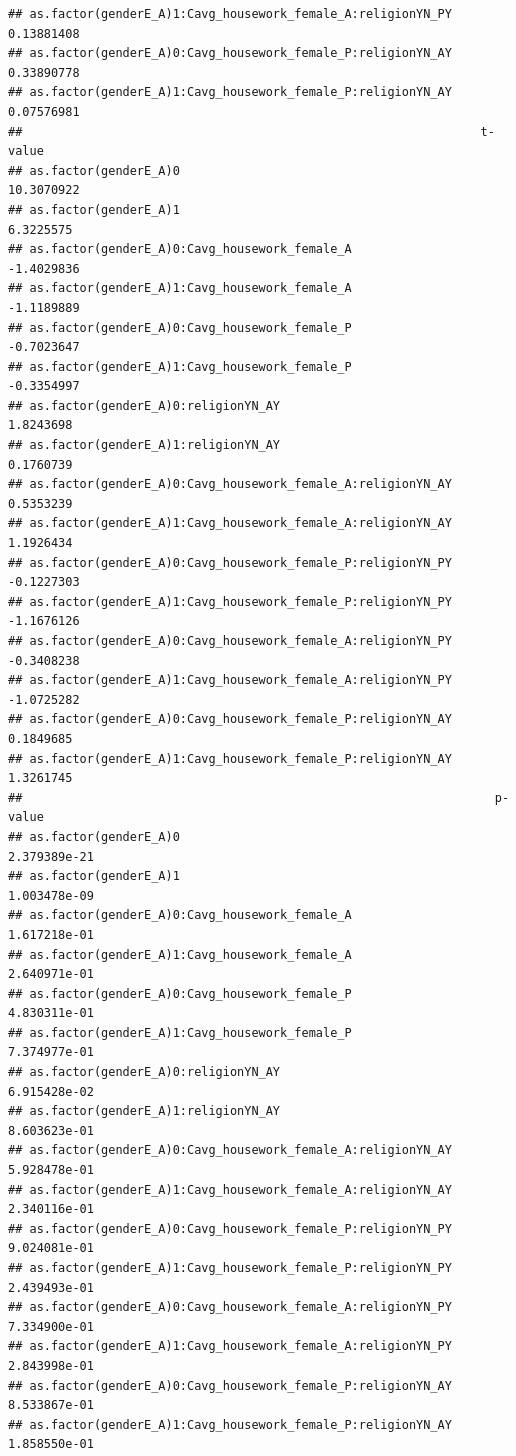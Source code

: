 \documentclass[
  man,floatsintext]{apa6}
\begin{document}
\begin{verbatim}
## as.factor(genderE_A)1:Cavg_housework_female_A:religionYN_PY 0.13881408
## as.factor(genderE_A)0:Cavg_housework_female_P:religionYN_AY 0.33890778
## as.factor(genderE_A)1:Cavg_housework_female_P:religionYN_AY 0.07576981
##                                                                t-value
## as.factor(genderE_A)0                                       10.3070922
## as.factor(genderE_A)1                                        6.3225575
## as.factor(genderE_A)0:Cavg_housework_female_A               -1.4029836
## as.factor(genderE_A)1:Cavg_housework_female_A               -1.1189889
## as.factor(genderE_A)0:Cavg_housework_female_P               -0.7023647
## as.factor(genderE_A)1:Cavg_housework_female_P               -0.3354997
## as.factor(genderE_A)0:religionYN_AY                          1.8243698
## as.factor(genderE_A)1:religionYN_AY                          0.1760739
## as.factor(genderE_A)0:Cavg_housework_female_A:religionYN_AY  0.5353239
## as.factor(genderE_A)1:Cavg_housework_female_A:religionYN_AY  1.1926434
## as.factor(genderE_A)0:Cavg_housework_female_P:religionYN_PY -0.1227303
## as.factor(genderE_A)1:Cavg_housework_female_P:religionYN_PY -1.1676126
## as.factor(genderE_A)0:Cavg_housework_female_A:religionYN_PY -0.3408238
## as.factor(genderE_A)1:Cavg_housework_female_A:religionYN_PY -1.0725282
## as.factor(genderE_A)0:Cavg_housework_female_P:religionYN_AY  0.1849685
## as.factor(genderE_A)1:Cavg_housework_female_P:religionYN_AY  1.3261745
##                                                                  p-value
## as.factor(genderE_A)0                                       2.379389e-21
## as.factor(genderE_A)1                                       1.003478e-09
## as.factor(genderE_A)0:Cavg_housework_female_A               1.617218e-01
## as.factor(genderE_A)1:Cavg_housework_female_A               2.640971e-01
## as.factor(genderE_A)0:Cavg_housework_female_P               4.830311e-01
## as.factor(genderE_A)1:Cavg_housework_female_P               7.374977e-01
## as.factor(genderE_A)0:religionYN_AY                         6.915428e-02
## as.factor(genderE_A)1:religionYN_AY                         8.603623e-01
## as.factor(genderE_A)0:Cavg_housework_female_A:religionYN_AY 5.928478e-01
## as.factor(genderE_A)1:Cavg_housework_female_A:religionYN_AY 2.340116e-01
## as.factor(genderE_A)0:Cavg_housework_female_P:religionYN_PY 9.024081e-01
## as.factor(genderE_A)1:Cavg_housework_female_P:religionYN_PY 2.439493e-01
## as.factor(genderE_A)0:Cavg_housework_female_A:religionYN_PY 7.334900e-01
## as.factor(genderE_A)1:Cavg_housework_female_A:religionYN_PY 2.843998e-01
## as.factor(genderE_A)0:Cavg_housework_female_P:religionYN_AY 8.533867e-01
## as.factor(genderE_A)1:Cavg_housework_female_P:religionYN_AY 1.858550e-01
\end{verbatim}
\end{document}
